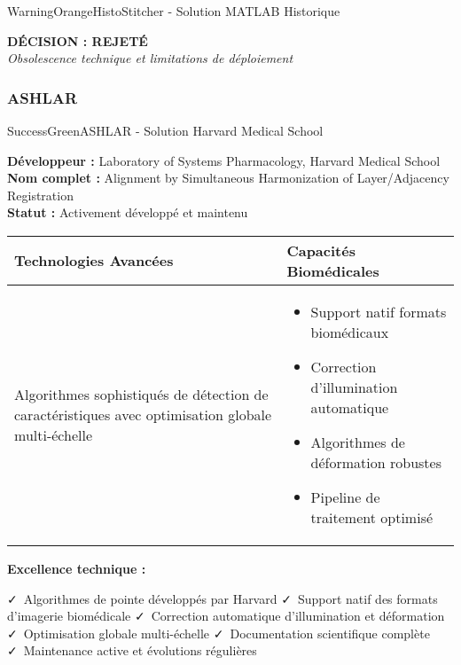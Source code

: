 \documentclass[12pt,a4paper]{report}
\newcommand{\pro}[1]{\textcolor{SuccessGreen}{\faCheck\ #1}}
\begin{document}
\begin{}
\begin{}
\begin{}
\begin{techbox}{WarningOrange}{HistoStitcher - Solution MATLAB Historique}
\begin{center}
\textbf{\textcolor{DangerRed}{DÉCISION : REJETÉ}}\\
\textit{Obsolescence technique et limitations de déploiement}
\end{center}

\end{techbox}

\subsubsection{ASHLAR}

\begin{techbox}{SuccessGreen}{ASHLAR - Solution Harvard Medical School}

\textbf{Développeur :} Laboratory of Systems Pharmacology, Harvard Medical School \\
\textbf{Nom complet :} Alignment by Simultaneous Harmonization of Layer/Adjacency Registration \\
\textbf{Statut :} Activement développé et maintenu

\vspace{0.5cm}

\begin{tabularx}{\textwidth}{|X|X|}
\hline
\rowcolor{LightGray}
\textbf{Technologies Avancées} & \textbf{Capacités Biomédicales} \\
\hline
Algorithmes sophistiqués de détection de caractéristiques avec optimisation globale multi-échelle &
\begin{itemize}[nosep]
\item Support natif formats biomédicaux
\item Correction d'illumination automatique
\item Algorithmes de déformation robustes
\item Pipeline de traitement optimisé
\end{itemize} \\
\hline
\end{tabularx}

\vspace{0.5cm}

\textbf{Excellence technique :}
\begin{itemize}[leftmargin=*]
    \pro{Algorithmes de pointe développés par Harvard}
    \pro{Support natif des formats d'imagerie biomédicale}
    \pro{Correction automatique d'illumination et déformation}
    \pro{Optimisation globale multi-échelle}
    \pro{Documentation scientifique complète}
    \pro{Maintenance active et évolutions régulières}
\end{itemize}


\end{techbox}
\end{}
\end{}
\end{}
\end{document}
